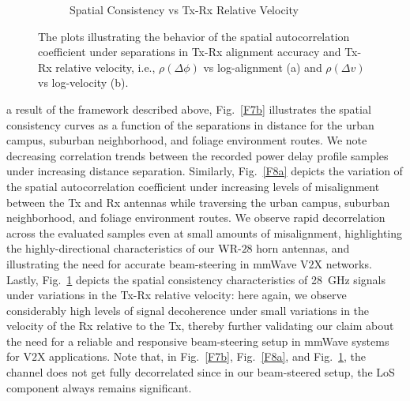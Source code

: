 \documentclass[12pt, draftcls, onecolumn]{IEEEtran}
\begin{document}
{\begin{figure} [t]
\begin{subfigure}{0.4885\linewidth}
         \caption{Spatial Consistency vs Tx-Rx Relative Velocity}
         \label{F8b}
     \end{subfigure}
     \vspace{-8mm}
     \caption{The plots illustrating the behavior of the spatial autocorrelation coefficient under separations in Tx-Rx alignment accuracy and Tx-Rx relative velocity, i.e., $\rho(\Delta \phi)$ vs log-alignment (a) and $\rho(\Delta v)$ vs log-velocity (b).}
     \label{F8}
\end{figure}
 a result of the framework described above, Fig.~\ref{F7b} illustrates the spatial consistency curves as a function of the separations in distance for the urban campus, suburban neighborhood, and foliage environment routes. We note decreasing correlation trends between the recorded power delay profile samples under increasing distance separation. Similarly, Fig.~\ref{F8a} depicts the variation of the spatial autocorrelation coefficient under increasing levels of misalignment between the Tx and Rx antennas while traversing the urban campus, suburban neighborhood, and foliage environment routes. We observe rapid decorrelation across the evaluated samples even at small amounts of misalignment, highlighting the highly-directional characteristics of our WR-$28$ horn antennas, and illustrating the need for accurate beam-steering in mmWave V$2$X networks. Lastly, Fig.~\ref{F8b} depicts the spatial consistency characteristics of \SI{28}{\giga\hertz} signals under variations in the Tx-Rx relative velocity: here again, we observe considerably high levels of signal decoherence under small variations in the velocity of the Rx relative to the Tx, thereby further validating our claim about the need for a reliable and responsive beam-steering setup in mmWave systems for V$2$X applications. Note that, in Fig.~\ref{F7b}, Fig.~\ref{F8a}, and Fig.~\ref{F8b}, the channel does not get fully decorrelated since in our beam-steered setup, the LoS component always remains significant.
\begin{figure} [t]
     \centering
     \begin{subfigure}{0.4815\linewidth}
         \centering

\end{subfigure}
\end{figure}}
\end{document}
